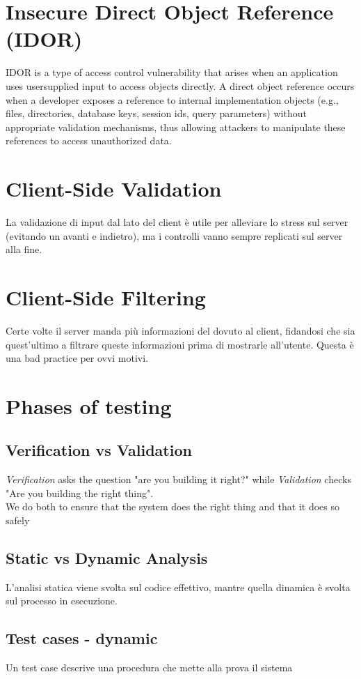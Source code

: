 \documentclass{article}
\begin{document}
\section{Insecure Direct Object Reference (IDOR)}
IDOR is a type of access control vulnerability that arises when an application uses usersupplied input to access objects directly.
A direct object reference occurs when a developer exposes a reference to internal
implementation objects (e.g., files, directories, database keys, session ids, query
parameters) without appropriate validation mechanisms, thus allowing attackers to
manipulate these references to access unauthorized data.

\section{Client-Side Validation}
La validazione di input dal lato del client è utile per alleviare lo stress sul server (evitando un avanti e indietro), ma i controlli vanno sempre replicati sul server alla fine.

\section{Client-Side Filtering}
Certe volte il server manda più informazioni del dovuto al client, fidandosi che sia quest'ultimo a filtrare queste informazioni prima di mostrarle all'utente. Questa è una bad practice per ovvi motivi.

\section{Phases of testing}
\subsection{Verification vs Validation}
\textit{Verification} asks the question "are you building it right?" while \textit{Validation} checks "Are you building the right thing".\\
We do both to ensure that the system does the right thing and that it does so safely

\subsection{Static vs Dynamic Analysis}
L'analisi statica viene svolta sul codice effettivo, mantre quella dinamica è svolta sul processo in esecuzione.

\subsection{Test cases - dynamic}
Un test case descrive una procedura che mette alla prova il sistema
\end{document}
